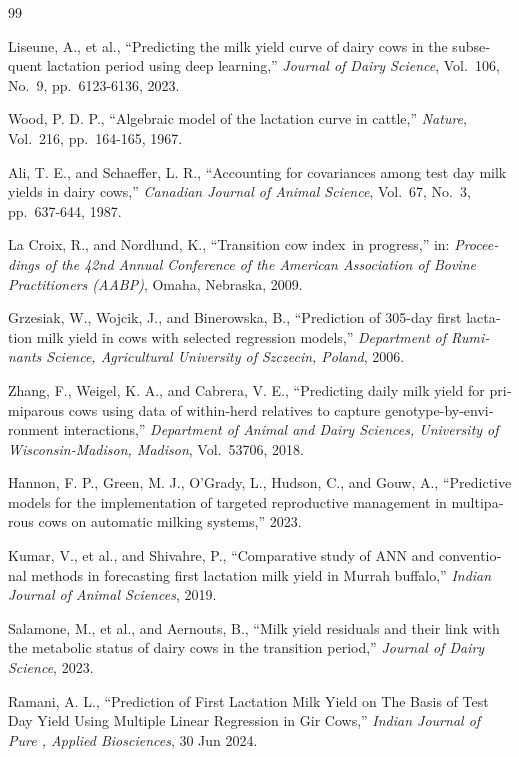 \begin{thebibliography}{99}
\begin{latin}
	\noindent Liseune, A., et al., ``Predicting the milk yield curve of dairy cows in the subsequent lactation period using deep learning,'' \textit{Journal of Dairy Science}, Vol.~106, No.~9, pp.~6123-6136, 2023.
	
	\noindent Wood, P. D. P., ``Algebraic model of the lactation curve in cattle,'' \textit{Nature}, Vol.~216, pp.~164-165, 1967.
	
	\noindent Ali, T. E., and Schaeffer, L. R., ``Accounting for covariances among test day milk yields in dairy cows,'' \textit{Canadian Journal of Animal Science}, Vol.~67, No.~3, pp.~637-644, 1987.
	
	\noindent La Croix, R., and Nordlund, K., ``Transition cow index\texttrademark\ in progress,'' in: \textit{Proceedings of the 42nd Annual Conference of the American Association of Bovine Practitioners (AABP)}, Omaha, Nebraska, 2009.
	
	\noindent Grzesiak, W., Wojcik, J., and Binerowska, B., ``Prediction of 305-day first lactation milk yield in cows with selected regression models,'' \textit{Department of Ruminants Science, Agricultural University of Szczecin, Poland}, 2006.
	
	\noindent Zhang, F., Weigel, K. A., and Cabrera, V. E., ``Predicting daily milk yield for primiparous cows using data of within-herd relatives to capture genotype-by-environment interactions,'' \textit{Department of Animal and Dairy Sciences, University of Wisconsin-Madison, Madison}, Vol.~53706, 2018.
	
	\noindent Hannon, F. P., Green, M. J., O’Grady, L., Hudson, C., and Gouw, A., ``Predictive models for the implementation of targeted reproductive management in multiparous cows on automatic milking systems,'' 2023.
	
	\noindent Kumar, V., et al., and Shivahre, P., ``Comparative study of ANN and conventional methods in forecasting first lactation milk yield in Murrah buffalo,'' \textit{Indian Journal of Animal Sciences}, 2019.
	
	\noindent Salamone, M., et al., and Aernouts, B., ``Milk yield residuals and their link with the metabolic status of dairy cows in the transition period,'' \textit{Journal of Dairy Science}, 2023.
	
	\noindent Ramani, A. L., ``Prediction of First Lactation Milk Yield on The Basis of Test Day Yield Using Multiple Linear Regression in Gir Cows,'' \textit{Indian Journal of Pure , Applied Biosciences}, 30 Jun 2024.
	

\end{latin}
\end{thebibliography}
